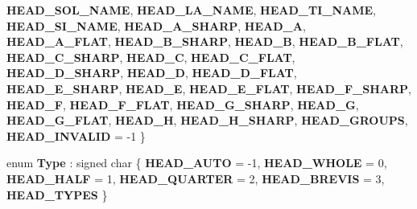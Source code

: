 \begin{DoxyCompactItemize}
{\bfseries H\+E\+A\+D\+\_\+\+S\+O\+L\+\_\+\+N\+A\+ME}, 
{\bfseries H\+E\+A\+D\+\_\+\+L\+A\+\_\+\+N\+A\+ME}, 
{\bfseries H\+E\+A\+D\+\_\+\+T\+I\+\_\+\+N\+A\+ME}, 
\newline
{\bfseries H\+E\+A\+D\+\_\+\+S\+I\+\_\+\+N\+A\+ME}, 
{\bfseries H\+E\+A\+D\+\_\+\+A\+\_\+\+S\+H\+A\+RP}, 
{\bfseries H\+E\+A\+D\+\_\+A}, 
{\bfseries H\+E\+A\+D\+\_\+\+A\+\_\+\+F\+L\+AT}, 
\newline
{\bfseries H\+E\+A\+D\+\_\+\+B\+\_\+\+S\+H\+A\+RP}, 
{\bfseries H\+E\+A\+D\+\_\+B}, 
{\bfseries H\+E\+A\+D\+\_\+\+B\+\_\+\+F\+L\+AT}, 
{\bfseries H\+E\+A\+D\+\_\+\+C\+\_\+\+S\+H\+A\+RP}, 
\newline
{\bfseries H\+E\+A\+D\+\_\+C}, 
{\bfseries H\+E\+A\+D\+\_\+\+C\+\_\+\+F\+L\+AT}, 
{\bfseries H\+E\+A\+D\+\_\+\+D\+\_\+\+S\+H\+A\+RP}, 
{\bfseries H\+E\+A\+D\+\_\+D}, 
\newline
{\bfseries H\+E\+A\+D\+\_\+\+D\+\_\+\+F\+L\+AT}, 
{\bfseries H\+E\+A\+D\+\_\+\+E\+\_\+\+S\+H\+A\+RP}, 
{\bfseries H\+E\+A\+D\+\_\+E}, 
{\bfseries H\+E\+A\+D\+\_\+\+E\+\_\+\+F\+L\+AT}, 
\newline
{\bfseries H\+E\+A\+D\+\_\+\+F\+\_\+\+S\+H\+A\+RP}, 
{\bfseries H\+E\+A\+D\+\_\+F}, 
{\bfseries H\+E\+A\+D\+\_\+\+F\+\_\+\+F\+L\+AT}, 
{\bfseries H\+E\+A\+D\+\_\+\+G\+\_\+\+S\+H\+A\+RP}, 
\newline
{\bfseries H\+E\+A\+D\+\_\+G}, 
{\bfseries H\+E\+A\+D\+\_\+\+G\+\_\+\+F\+L\+AT}, 
{\bfseries H\+E\+A\+D\+\_\+H}, 
{\bfseries H\+E\+A\+D\+\_\+\+H\+\_\+\+S\+H\+A\+RP}, 
\newline
{\bfseries H\+E\+A\+D\+\_\+\+G\+R\+O\+U\+PS}, 
{\bfseries H\+E\+A\+D\+\_\+\+I\+N\+V\+A\+L\+ID} = -\/1
 \}
\item 
\mbox{\label{class_ms_1_1_note_head_a31c343e7e7f09fee0246ef6a1d7a4e87}} 
enum {\bfseries Type} \+: signed char \{ \newline
{\bfseries H\+E\+A\+D\+\_\+\+A\+U\+TO} = -\/1, 
{\bfseries H\+E\+A\+D\+\_\+\+W\+H\+O\+LE} = 0, 
{\bfseries H\+E\+A\+D\+\_\+\+H\+A\+LF} = 1, 
{\bfseries H\+E\+A\+D\+\_\+\+Q\+U\+A\+R\+T\+ER} = 2, 
\newline
{\bfseries H\+E\+A\+D\+\_\+\+B\+R\+E\+V\+IS} = 3, 
{\bfseries H\+E\+A\+D\+\_\+\+T\+Y\+P\+ES}
 \}
\end{DoxyCompactItemize}
